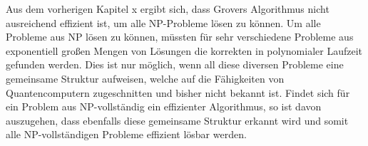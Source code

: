 Aus dem vorherigen Kapitel x ergibt sich, dass Grovers Algorithmus nicht ausreichend effizient ist, um alle NP-Probleme lösen zu können. 
Um alle Probleme aus NP lösen zu können, müssten für sehr verschiedene Probleme aus exponentiell großen Mengen von Lösungen die korrekten in polynomialer Laufzeit gefunden werden. 
Dies ist nur möglich, wenn all diese diversen Probleme eine gemeinsame Struktur aufweisen, welche auf die Fähigkeiten von Quantencomputern zugeschnitten und bisher nicht bekannt ist. 
Findet sich für ein Problem aus NP-vollständig ein effizienter Algorithmus, so ist davon auszugehen, dass ebenfalls diese gemeinsame Struktur erkannt wird und somit alle NP-vollständigen Probleme effizient lösbar werden.